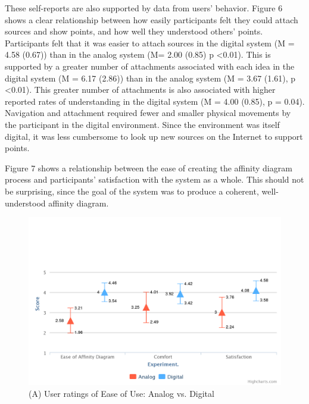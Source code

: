\documentclass{sigchi}
\begin{document}
These self-reports are also supported by data from users' behavior.  Figure 6 shows a clear relationship between how easily participants felt they could attach sources and show points, and how well they understood others' points. Participants felt that it was easier to attach sources in the digital system (M = 4.58 (0.67)) than in the analog system (M= 2.00 (0.85)  p \textless 0.01). This is supported by a greater number of attachments associated with each idea in the digital system (M = 6.17 (2.86)) than in the analog system (M = 3.67 (1.61), p \textless 0.01). This greater number of attachments is also associated with higher reported rates of understanding in the digital system (M = 4.00 (0.85), p = 0.04). Navigation and attachment required fewer and smaller physical movements by the participant in the digital environment. Since the environment was itself digital, it was less cumbersome to look up new sources on the Internet to support points. 

Figure 7 shows a relationship between the ease of creating the affinity diagram process and participants' satisfaction with the system as a whole. This should not be surprising, since the goal of the system was to produce a coherent, well-understood affinity diagram.

\begin{figure}[!h]
\centering
\includegraphics[width=1.0\columnwidth]{affinity}
\caption{(A) User ratings of Ease of Use: Analog vs. Digital}
\label{fig:figure1}
\end{figure}
\end{document}
